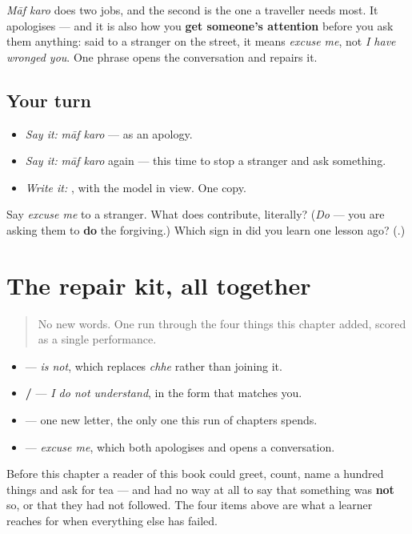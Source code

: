 \begin{culture}
\emph{Māf karo} does two jobs, and the second is the one a traveller needs most. It apologises — and it is also how you \textbf{get someone's attention} before you ask them anything: said to a stranger on the street, it means \emph{excuse me}, not \emph{I have wronged you}. One phrase opens the conversation and repairs it.
\end{culture}

\subsection*{Your turn}
\begin{itemize}
\raggedright
  \item \emph{Say it:} \emph{māf karo} — as an apology.
  \item \emph{Say it:} \emph{māf karo} again — this time to stop a stranger and ask something.
  \item \emph{Write it:} \textbf{}, with the model in view. One copy.
\end{itemize}

\begin{tcolorbox}[breakable,colback=teal!4,colframe=teal!35!black,title={Before you move on}]
Say \emph{excuse me} to a stranger. What does \textbf{} contribute, literally? (\emph{Do} — you are asking them to \textbf{do} the forgiving.) Which sign in \textbf{} did you learn one lesson ago? (\textbf{}.)
\end{tcolorbox}
\section[Practice]{The repair kit, all together}

\label{lesson:GU-C31-repair-five}



\begin{quote}
No new words. One run through the four things this chapter added, scored as a single performance.
\end{quote}

\begin{grammarlens}[title={What you've built}]
\begin{itemize}
\raggedright
  \item \textbf{} — \emph{is not}, which replaces \emph{chhe} rather than joining it.
  \item \textbf{ /  } — \emph{I do not understand}, in the form that matches you.
  \item \textbf{} — one new letter, the only one this run of chapters spends.
  \item \textbf{ } — \emph{excuse me}, which both apologises and opens a conversation.
\end{itemize}

Before this chapter a reader of this book could greet, count, name a hundred things and ask for tea — and had no way at all to say that something was \textbf{not} so, or that they had not followed. The four items above are what a learner reaches for when everything else has failed.
\end{grammarlens}

